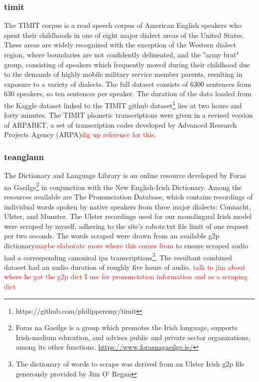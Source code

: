 \documentclass[thesis]{cluu}
\newcommand{\todo}[1]{\textcolor{red}{#1}}
\begin{document}
\subsubsection{timit}
The TIMIT corpus is a read speech corpus of American English speakers who spent their childhoods in one of eight major dialect areas of the United States. These areas are widely recognized with the exception of the Western dialect region, where boundaries are not confidently delineated, and the "army brat" group, consisting of speakers which frequently moved during their childhood due to the demands of highly mobile military service member parents, resulting in exposure to a variety of dialects\parencite{garofoloDARPATIMITAcousticphonetic1993}. The full dataset consists of 6300 sentences from 630 speakers, so ten sentences per speaker. The duration of the data loaded from the Kaggle dataset linked to the TIMIT github dataset\footnote{https://github.com/philipperemy/timit} lies at two hours and forty minutes. The TIMIT phonetic transcriptions were given in a revised version of ARPABET, a set of transcription codes developed by Advanced Research Projects Agency (ARPA)\todo{dig up reference for this}. 

\subsubsection{teanglann}
The Dictionary and Language Library is an online resource developed by Foras na Gaeilge\footnote{Foras na Gaeilge is a group which promotes the Irish language, supports Irish-medium education, and advises public and private sector organizations, among its other functions. \url{https://www.forasnagaeilge.ie/}} in conjunction with the New English-Irish Dictionary. Among the resources available are The Pronunciation Database, which contains recordings of individual words spoken by native speakers from three major dialects: Connacht, Ulster, and Munster. The Ulster recordings used for our monolingual Irish model were scraped by myself, adhering to the site's robots.txt file limit of one request per two seconds. The words scraped were drawn from an available \gls{g2p} dictionary\todo{maybe elaborate more where this comes from} to ensure scraped audio had a corresponding canonical \gls{ipa} transcriptions\footnote{The dictionary of words to scrape was derived from an Ulster Irish \gls{g2p} file generously provided by Jim O' Regan}. The resultant combined dataset had an audio duration of roughly five hours of audio.
\todo{talk to jim about where he got the g2p dict I use for pronunciation information and as a scraping dict}
\end{document}
